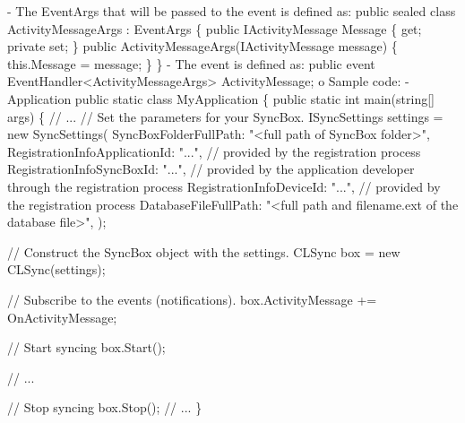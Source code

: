 \begin{DoxyCode}
    - The EventArgs that will be passed to the \textcolor{keyword}{event} is defined as:
          \textcolor{keyword}{public} sealed \textcolor{keyword}{class }ActivityMessageArgs : EventArgs
          \{
              \textcolor{keyword}{public} IActivityMessage Message \{ \textcolor{keyword}{get}; \textcolor{keyword}{private} \textcolor{keyword}{set}; \}
              \textcolor{keyword}{public} ActivityMessageArgs(IActivityMessage message)
              \{
                  this.Message = message;
              \}
          \}
    - The \textcolor{keyword}{event} is defined as:
          \textcolor{keyword}{public} \textcolor{keyword}{event} EventHandler<ActivityMessageArgs> ActivityMessage;
  o Sample code:
    - Application
      \textcolor{keyword}{public} \textcolor{keyword}{static} \textcolor{keyword}{class }MyApplication
      \{
          \textcolor{keyword}{public} \textcolor{keyword}{static} \textcolor{keywordtype}{int} main(\textcolor{keywordtype}{string}[] args)
          \{
              \textcolor{comment}{// ...}
              \textcolor{comment}{// Set the parameters for your SyncBox.}
              ISyncSettings settings = \textcolor{keyword}{new} SyncSettings(
                  SyncBoxFolderFullPath: \textcolor{stringliteral}{"<full path of SyncBox folder>"},
                  RegistrationInfoApplicationId: \textcolor{stringliteral}{"..."},   \textcolor{comment}{// provided by the
       registration process}
                  RegistrationInfoSyncBoxId: \textcolor{stringliteral}{"..."},       \textcolor{comment}{// provided by the
       application developer through the registration process}
                  RegistrationInfoDeviceId: \textcolor{stringliteral}{"..."},        \textcolor{comment}{// provided by the
       registration process}
                  DatabaseFileFullPath: \textcolor{stringliteral}{"<full path and filename.ext of the
       database file>"},
                   );
        
              \textcolor{comment}{// Construct the SyncBox object with the settings.}
              CLSync box = \textcolor{keyword}{new} CLSync(settings);

              \textcolor{comment}{// Subscribe to the events (notifications).}
              box.ActivityMessage += OnActivityMessage;
    
              \textcolor{comment}{// Start syncing}
              box.Start(); 
    
              \textcolor{comment}{// ...}
    
              \textcolor{comment}{// Stop syncing}
              box.Stop();
              \textcolor{comment}{// ...}
          \}


\end{DoxyCode}

